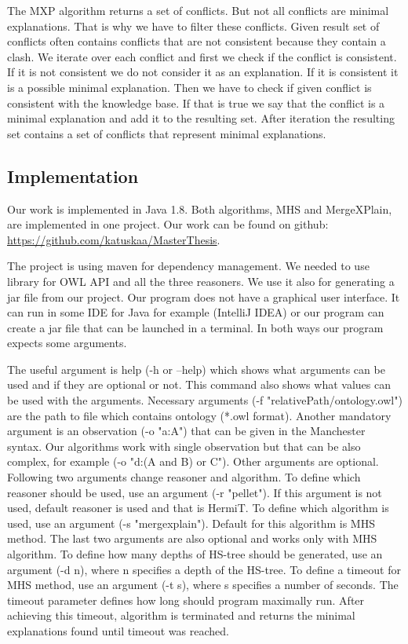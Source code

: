 \documentclass[12pt,a4paper]{article}
\begin{document}
The MXP algorithm returns a set of conflicts. But not all conflicts are minimal explanations. That is why we have to filter these conflicts. Given result set of conflicts often contains conflicts that are not consistent because they contain a clash. We iterate over each conflict and first we check if the conflict is consistent. If it is not consistent we do not consider it as an explanation. If it is consistent it is a possible minimal explanation. Then we have to check if given conflict is consistent with the knowledge base. If that is true we say that the conflict is a minimal explanation and add it to the resulting set. After iteration the resulting set contains a set of conflicts that represent minimal explanations.

\subsection{Implementation}
Our work is implemented in Java 1.8. Both algorithms, MHS and MergeXPlain, are implemented in one project. Our work can be found on github: \url{https://github.com/katuskaa/MasterThesis}. 

The project is using maven for dependency management. We needed to use library for OWL API and all the three reasoners. We use it also for generating a jar file from our project. Our program does not have a graphical user interface. It can run in some IDE for Java for example (IntelliJ IDEA) or our program can create a jar file that can be launched in a terminal. In both ways our program expects some arguments. 

The useful argument is help (-h or --help) which shows what arguments can be used and if they are optional or not. This command also shows what values can be used with the arguments. Necessary arguments (-f "relativePath/ontology.owl") are the path to file which contains ontology (*.owl format). Another mandatory argument is an observation (-o "a:A") that can be given in the Manchester syntax. Our algorithms work with single observation but that can be also complex, for example (-o "d:(A and B) or C"). Other arguments are optional. Following two arguments change reasoner and algorithm. To define which reasoner should be used, use an argument (-r "pellet"). If this argument is not used, default reasoner is used and that is HermiT. To define which algorithm is used, use an argument (-s "mergexplain"). Default for this algorithm is MHS method. The last two arguments are also optional and works only with MHS algorithm. To define how many depths of HS-tree should be generated, use an argument (-d n), where n specifies a depth of the HS-tree. To define a timeout for MHS method, use an argument (-t s), where s specifies a number of seconds. The timeout parameter defines how long should program maximally run. After achieving this timeout, algorithm is terminated and returns the minimal explanations found until timeout was reached.
\end{document}
